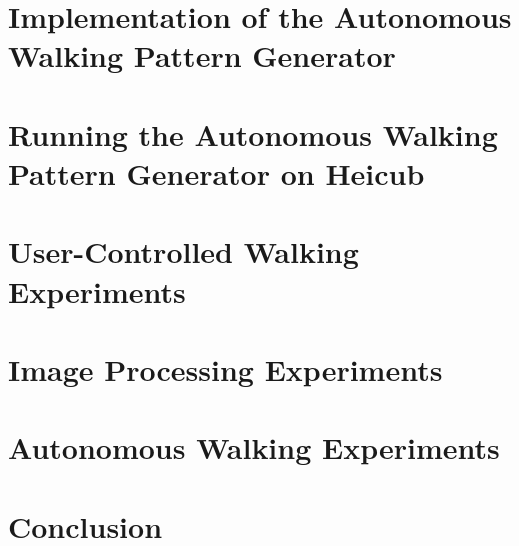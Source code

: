 \documentclass  [
paper    = a4,
BCOR     = 10mm,
twoside,
fontsize = 12pt,
toc      = bibnumbered,
toc      = listofnumbered,
numbers  = noendperiod,
headings = normal,
listof   = leveldown,
version  = 3.03
]                                       {scrreprt}
\begin{document}
	\chapter{Implementation of the Autonomous Walking Pattern Generator}
	
	
	
	
	
	
	\chapter{Running the Autonomous Walking Pattern Generator on Heicub}
	
	
	\chapter{User-Controlled Walking Experiments}
	
	

	\chapter{Image Processing Experiments}
	

	\chapter{Autonomous Walking Experiments}
	
	
	\chapter{Conclusion}
	
	
\end{document}
